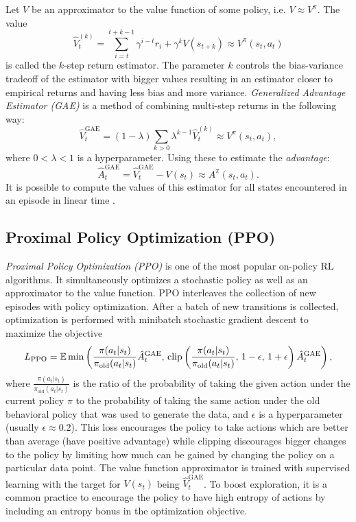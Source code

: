 Let $V$ be an approximator to the value function of some policy, i.e. $V \approx V^\pi$.
The value $$\hat{V}_t^{(k)}=\sum_{i=t}^{t+k-1} \gamma^{i-t} r_i + \gamma^{k} V(s_{t+k}) \approx V^\pi(s_t,a_t)$$
is called the $k$-step return estimator.
The parameter $k$ controls the bias-variance tradeoff of the estimator
with bigger values resulting in an estimator closer
to empirical returns and having less bias and more variance.
\emph{Generalized Advantage Estimator (GAE)} \citep{gae}
is a method of combining multi-step returns in the following way:
$$\hat{V}_t^\text{GAE} = (1-\lambda) \sum_{k>0}\lambda^{k-1} \hat{V}_t^{(k)} \approx V^\pi(s_t,a_t),$$
where $0<\lambda<1$ is a hyperparameter. Using these to estimate the \emph{advantage}:
$$\hat{A}_t^\text{GAE} = \hat{V}_t^\text{GAE} - V(s_t) \approx A^\pi(s_t,a_t).$$
It is possible
to compute the values of this estimator for all states
encountered in an episode in linear time \citep{gae}.

\subsection{Proximal Policy Optimization (PPO)} \label{sec:ppo}

\emph{Proximal Policy Optimization (PPO)} \citep{ppo} is one of the most popular on-policy RL algorithms.
It simultaneously optimizes a stochastic policy as well as an approximator to the value function.
PPO interleaves the collection of new episodes with policy optimization.
After a batch of new transitions is collected, optimization is performed
with minibatch stochastic gradient descent to maximize the objective $$L_{\text{PPO}}=\mathbb{E} \min \left( \frac{\pi(a_t|s_t)}{\pi_{\text{old}}(a_t|s_t)} \hat{A}^\text{GAE}_t,\, \mbox{clip}\left(\frac{\pi(a_t|s_t)}{\pi_{\text{old}}(a_t|s_t)},\,1-\epsilon,\,1+\epsilon \right)\hat{A}^\text{GAE} _t\right),$$ where
$\frac{\pi(a_t|s_t)}{\pi_{\text{old}}(a_t|s_t)}$ is the ratio of the probability of taking the given action under the current policy $\pi$ to the probability
of taking the same action under the old behavioral policy that was used to generate the data,
and $\epsilon$ is a hyperparameter (usually $\epsilon \approx 0.2$).
This loss encourages the policy to take actions which are better than average (have positive advantage)
while clipping discourages bigger changes to the policy by limiting how much can be gained
by changing the policy on a particular data point.
The value function approximator is trained with supervised learning with the target for $V(s_t)$ being $\hat{V}_t^\text{GAE}$.
To boost exploration, it is a common practice to encourage the policy to have high entropy of actions by including an entropy bonus in the optimization objective.
